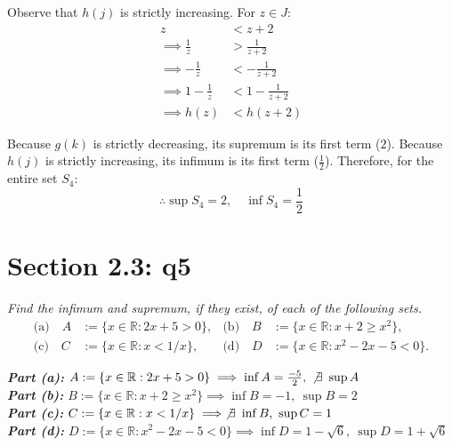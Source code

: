 \documentclass[11pt]{article}
\newcommand{\question}[1]{
    \begin{mdframed}[
        linecolor=gray,       %
        linewidth=0.5pt,      %
        innertopmargin=10pt,  %
        innerbottommargin=10pt %
    ]
    \centering \itshape \color{gray} #1
    \end{mdframed}
}
\theoremstyle{plain}
\begin{document}
Observe that $h(j)$ is strictly increasing. For $z \in J$:
$$
	\begin{aligned}
		z                      & < z+2             \\
		\implies \frac{1}{z}   & > \frac{1}{z+2}   \\
		\implies -\frac{1}{z}  & < -\frac{1}{z+2}  \\
		\implies 1-\frac{1}{z} & < 1-\frac{1}{z+2} \\
		\implies h(z)          & < h(z+2)
	\end{aligned}
$$

Because $g(k)$ is strictly decreasing, its supremum is its first term ($2$). Because $h(j)$ is strictly increasing, its infimum is its first term ($\frac{1}{2}$). Therefore, for the entire set $S_4$:
$$ \therefore \sup S_4 = 2, \quad \inf S_4 = \frac{1}{2} $$
\section*{Section 2.3: q5}
\question{Find the infimum and supremum, if they exist, of each of the following sets.
	\[
		\begin{aligned}
			\text{(a)} \quad A & := \{x \in \mathbb{R} : 2x + 5 > 0\}, & \text{(b)} \quad B & := \{x \in \mathbb{R} : x + 2 \geq x^2\},   \\
			\text{(c)} \quad C & := \{x \in \mathbb{R} : x < 1/x\},    & \text{(d)} \quad D & := \{x \in \mathbb{R} : x^2 - 2x - 5 < 0\}.
		\end{aligned}
	\]
}
\textit{\textbf{Part (a):} $A := \{x \in \mathbb{R} : 2x + 5 > 0\} \implies \inf A = \frac{-5}{2}, ~\not \exists ~\sup A$} \\
\textit{\textbf{Part (b):} $B := \{x \in \mathbb{R} : x + 2 \geq x^2\} \implies \inf B =-1, ~\sup B=2$} \\
\textit{\textbf{Part (c):} $C := \{x \in \mathbb{R} : x < 1/x\} \implies \not \exists ~\inf B, ~\sup C=1$} \\
\textit{\textbf{Part (d):} $D := \{x \in \mathbb{R} : x^2 - 2x - 5 < 0\} \implies \inf D= 1- \sqrt{6}, ~\sup D=1+\sqrt{6}$} \\
\end{document}
